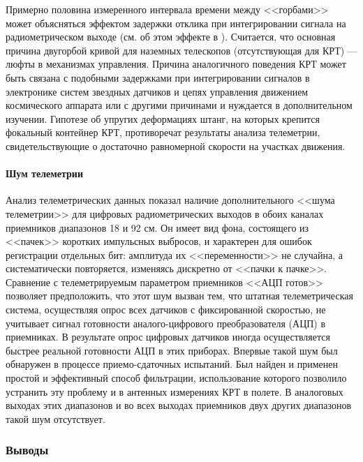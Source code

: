 Примерно половина измеренного интервала времени между <<горбами>> может объясняться эффектом
задержки отклика при интегрировании сигнала на радиометрическом выходе (см. об этом эффекте в
\cite{Kuzmin_1964}). Считается, что основная причина двугорбой кривой для наземных телескопов
(отсутствующая для КРТ) --- люфты в механизмах управления. Причина аналогичного поведения КРТ может
быть связана с подобными задержками при интегрировании сигналов в электронике систем звездных
датчиков и цепях управления движением космического аппарата или с другими причинами и нуждается в
дополнительном изучении. Гипотезе об упругих деформациях штанг, на которых крепится фокальный
контейнер КРТ, противоречат результаты анализа телеметрии, свидетельствующие о достаточно
равномерной скорости на участках движения.

\paragraph{Шум телеметрии}

Анализ телеметрических данных показал наличие дополнительного
<<шума телеметрии>> для цифровых радиометрических выходов в обоих каналах
приемников диапазонов 18 и 92 см.
Он имеет вид фона, состоящего из <<пачек>> коротких импульсных
выбросов, и характерен для ошибок регистрации отдельных бит: амплитуда их
<<переменности>> не случайна, а систематически повторяется, изменяясь дискретно
от <<пачки к пачке>>. Сравнение с телеметрируемым параметром приемников <<АЦП готов>>
позволяет предположить, что этот шум вызван тем, что штатная телеметрическая система,
осуществляя опрос всех датчиков с фиксированной скоростью, не учитывает сигнал
готовности аналого-цифрового преобразователя (АЦП) в приемниках.
В результате опрос цифровых датчиков иногда осуществляется быстрее
реальной готовности АЦП в этих приборах. Впервые такой шум был обнаружен в
процессе приемо-сдаточных испытаний. Был найден и применен простой и эффективный
способ фильтрации, использование которого позволило устранить эту проблему
и в антенных измерениях КРТ в полете. В аналоговых выходах этих диапазонов
и во всех выходах приемников двух других диапазонов такой шум отсутствует.


\subsubsection{Выводы}

